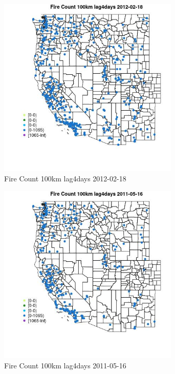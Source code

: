 \begin{figure} 
\centering  
\includegraphics[width=0.77\textwidth]{Code_Outputs/Report_ML_input_PM25_Step4_part_f_de_duplicated_aveswNAs_MapObsFire_Count_100km_lag4days2012-02-18.jpg} 
\caption{\label{fig:Report_ML_input_PM25_Step4_part_f_de_duplicated_aveswNAsMapObsFire_Count_100km_lag4days2012-02-18}Fire Count 100km lag4days 2012-02-18} 
\end{figure} 
 

\begin{figure} 
\centering  
\includegraphics[width=0.77\textwidth]{Code_Outputs/Report_ML_input_PM25_Step4_part_f_de_duplicated_aveswNAs_MapObsFire_Count_100km_lag4days2011-05-16.jpg} 
\caption{\label{fig:Report_ML_input_PM25_Step4_part_f_de_duplicated_aveswNAsMapObsFire_Count_100km_lag4days2011-05-16}Fire Count 100km lag4days 2011-05-16} 
\end{figure} 
 

